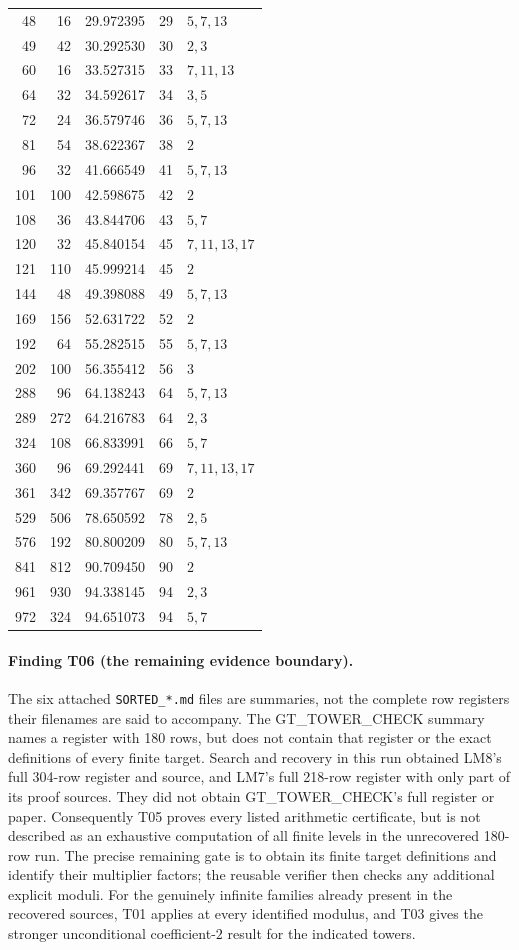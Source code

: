\documentclass[11pt,a4paper]{article}
\begin{document}
\begin{longtable}{rrrrl}
48 & 16 & 29.972395 & 29 & $5,7,13$ \\
49 & 42 & 30.292530 & 30 & $2,3$ \\
60 & 16 & 33.527315 & 33 & $7,11,13$ \\
64 & 32 & 34.592617 & 34 & $3,5$ \\
72 & 24 & 36.579746 & 36 & $5,7,13$ \\
81 & 54 & 38.622367 & 38 & $2$ \\
96 & 32 & 41.666549 & 41 & $5,7,13$ \\
101 & 100 & 42.598675 & 42 & $2$ \\
108 & 36 & 43.844706 & 43 & $5,7$ \\
120 & 32 & 45.840154 & 45 & $7,11,13,17$ \\
121 & 110 & 45.999214 & 45 & $2$ \\
144 & 48 & 49.398088 & 49 & $5,7,13$ \\
169 & 156 & 52.631722 & 52 & $2$ \\
192 & 64 & 55.282515 & 55 & $5,7,13$ \\
202 & 100 & 56.355412 & 56 & $3$ \\
288 & 96 & 64.138243 & 64 & $5,7,13$ \\
289 & 272 & 64.216783 & 64 & $2,3$ \\
324 & 108 & 66.833991 & 66 & $5,7$ \\
360 & 96 & 69.292441 & 69 & $7,11,13,17$ \\
361 & 342 & 69.357767 & 69 & $2$ \\
529 & 506 & 78.650592 & 78 & $2,5$ \\
576 & 192 & 80.800209 & 80 & $5,7,13$ \\
841 & 812 & 90.709450 & 90 & $2$ \\
961 & 930 & 94.338145 & 94 & $2,3$ \\
972 & 324 & 94.651073 & 94 & $5,7$ \\
\hline
\end{longtable}


\paragraph{Finding T06 (the remaining evidence boundary).}
The six attached \texttt{SORTED\_*.md} files are summaries, not the
complete row registers their filenames are said to accompany. The
GT\_TOWER\_CHECK summary names a register with 180 rows, but does not
contain that register or the exact definitions of every finite target.
Search and recovery in this run obtained LM8's full 304-row register
and source, and LM7's full 218-row register with only part of its proof
sources. They did not obtain GT\_TOWER\_CHECK's full register or paper.
Consequently T05 proves every listed arithmetic certificate, but is
not described as an exhaustive computation of all finite levels in
the unrecovered 180-row run. The precise remaining gate is to obtain
its finite target definitions and identify their multiplier factors;
the reusable verifier then checks any additional explicit moduli.
For the genuinely infinite families already present in the recovered
sources, T01 applies at every identified modulus, and T03 gives the
stronger unconditional coefficient-$2$ result for the indicated towers.
\end{document}
